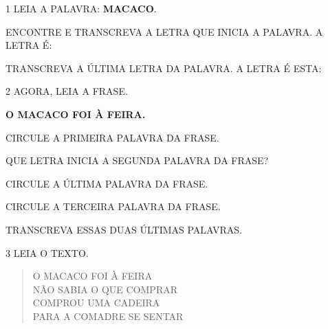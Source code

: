 
\num{1} LEIA A PALAVRA: \textbf{MACACO}.


\begin{escolha}
\item ENCONTRE E TRANSCREVA A LETRA QUE INICIA A PALAVRA.
A LETRA É:

\item TRANSCREVA A ÚLTIMA LETRA DA PALAVRA. A LETRA É ESTA:
\end{escolha}

\num{2} AGORA, LEIA A FRASE.

\begin{myquote}
\textbf{O MACACO FOI À FEIRA.}
\end{myquote}

\begin{escolha}
\item CIRCULE A PRIMEIRA PALAVRA DA FRASE.

\item QUE LETRA INICIA A SEGUNDA PALAVRA DA FRASE?


\item CIRCULE A ÚLTIMA PALAVRA DA FRASE.

\item CIRCULE A TERCEIRA PALAVRA DA FRASE.

\item TRANSCREVA ESSAS DUAS ÚLTIMAS PALAVRAS.

\end{escolha}\enlargethispage{5\baselineskip}

\num{3} LEIA O TEXTO.

\begin{myquote}
\begin{verse}
O MACACO FOI À FEIRA\\
NÃO SABIA O QUE COMPRAR\\
COMPROU UMA CADEIRA\\
PARA A COMADRE SE SENTAR
\end{verse}

\end{myquote}

